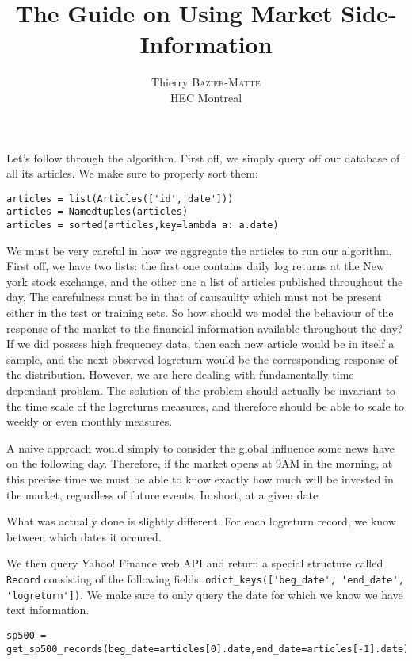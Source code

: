 \documentclass{article}[10pt]
\title{The Guide on Using Market Side-Information}
\author{Thierry \textsc{Bazier-Matte}\\HEC Montreal}
\begin{document}
\maketitle

Let's follow through the algorithm. First off, we simply query off our database of all its
articles. We make sure to properly sort them: 
\begin{verbatim}
articles = list(Articles(['id','date']))
articles = Namedtuples(articles)
articles = sorted(articles,key=lambda a: a.date)
\end{verbatim}

We must be very careful in how we aggregate the articles to run our algorithm. First off,
we have two lists: the first one contains daily log returns at the New york stock
exchange, and the other one a list of articles published throughout the day. The
carefulness must be in that of causaulity which must not be present either in the test or
training sets. So how should we model the behaviour of the response of the market to the
financial information available throughout the day? If we did possess high frequency data,
then each new article would be in itself a sample, and the next observed logreturn would
be the corresponding response of the distribution. However, we are here dealing with
fundamentally time dependant problem. The solution of the problem should actually be
invariant to the time scale of the logreturns measures, and therefore should be able to
scale to weekly or even monthly measures.

A naive approach would simply to consider the global influence some news have on the
following day. Therefore, if the market opens at 9AM in the morning, at this precise time
we must be able to know exactly how much will be invested in the market, regardless of
future events. In short, at a given date 

What was actually done is slightly different. For each logreturn record, we know between
which dates it occured.

We then query Yahoo! Finance web API and return a special structure called \verb+Record+
consisting of the following fields:
\verb+odict_keys(['beg_date', 'end_date', 'logreturn'])+. We make sure to only query the
date for which we know we have text information. 
\begin{verbatim}
sp500 = get_sp500_records(beg_date=articles[0].date,end_date=articles[-1].date)
\end{verbatim}
\end{document}
